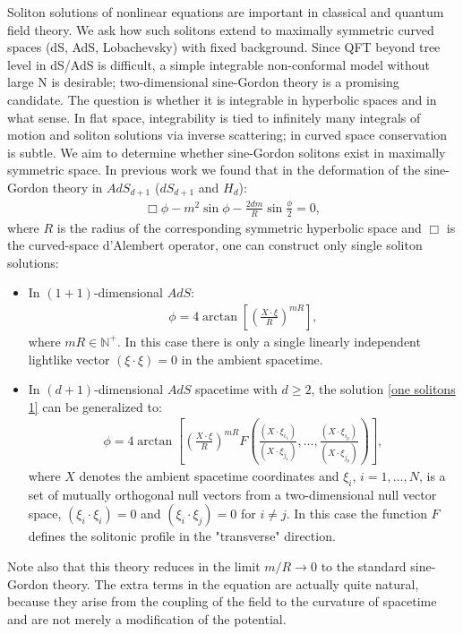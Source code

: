 \documentclass{article}
\begin{document}
Soliton solutions of nonlinear equations are important in classical and quantum field theory. We ask how such solitons extend to maximally symmetric curved spaces (dS, AdS, Lobachevsky) with fixed background. Since QFT beyond tree level in dS/AdS is difficult, a simple integrable non-conformal model without large N is desirable; two-dimensional sine-Gordon theory is a promising candidate. The question is whether it is integrable in hyperbolic spaces and in what sense. In flat space, integrability is tied to infinitely many integrals of motion and soliton solutions via inverse scattering; in curved space conservation is subtle. We aim to determine whether sine-Gordon solitons exist in maximally symmetric space. In previous work \cite{Akhmedov:2026msi} we found that in the deformation of the sine-Gordon theory in $AdS_{d+1}$ ($dS_{d+1}$ and  $H_d$):
\begin{align}
    \Box \phi - m^2 \sin \phi - \frac{2 d m}{R} \sin \frac{\phi}{2}=0, 
\end{align}
where $R$ is the radius of the corresponding symmetric hyperbolic space and $\Box$ is the curved-space d'Alembert operator, one can construct only single soliton solutions:
\begin{itemize}
\item In $(1+1)$-dimensional $AdS$:
\begin{align}
\label{one solitons 1}
    \phi= 4 \arctan\left[  \left(\frac{X \cdot \xi }{R}\right)^{m R}\right],
\end{align}
where $mR\in \mathbb{N}^+$. In this case there is only a single linearly independent lightlike vector $(\xi \cdot \xi)=0$ in the ambient spacetime.
\item In $(d+1)$-dimensional $AdS$ spacetime with $d \ge 2$, the solution \eqref{one solitons 1} can be generalized to:
\begin{align}
    \phi= 4 \arctan \left[ \left(\frac{X \cdot \xi}{R}\right )^{mR} F\left(\frac{(X \cdot\xi_{i_1}) }{(X \cdot\xi_{j_1})},...,\frac{(X \cdot\xi_{i_p}) }{(X \cdot\xi_{j_p})}\right) \right],
\end{align}
where $X$ denotes the ambient spacetime coordinates and $\xi_i$, $i=1,\dots,N$, is a set of mutually orthogonal null vectors from a two-dimensional null vector space, $(\xi_i \cdot \xi_i)=0$ and $(\xi_i \cdot \xi_j)=0$ for $i \neq j$.  In this case the function $F$ defines the solitonic profile in the "transverse" direction.
\end{itemize}
Note also that this theory reduces in the limit $m/R \to 0$ to the standard sine-Gordon theory. The extra terms in the equation are actually quite natural, because they arise from the coupling of the field to the curvature of spacetime and are not merely a modification of the potential.
\end{document}

